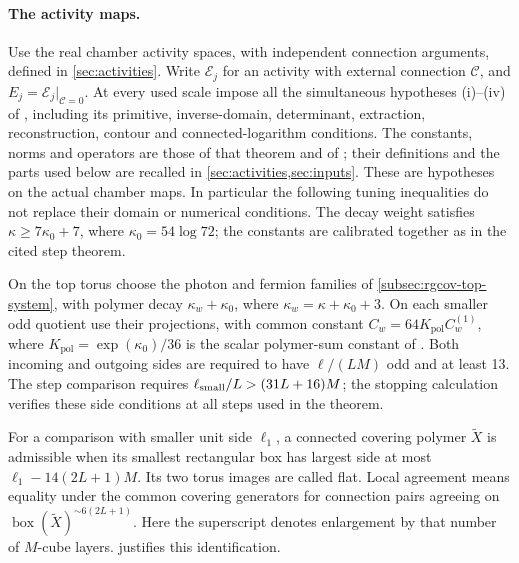 \paragraph{The activity maps.}
Use the real chamber activity spaces, with independent connection
arguments, defined in \cref{sec:activities}. Write \(\mathscr E_j\) for an activity
with external connection \(\mathscr C\), and \(E_j=\mathscr E_j|_{\mathscr C=0}\).
At every used scale impose all the simultaneous hypotheses
(i)--(iv) of \cite[Theorem~A]{NonlinearStep}, including its
primitive, inverse-domain, determinant, extraction, reconstruction,
contour and connected-logarithm conditions. The constants, norms and
operators are those of that theorem and of
\cite[Theorems~A--B]{NormalizedContraction}; their definitions and the
parts used below are recalled in \cref{sec:activities,sec:inputs}.
These are hypotheses on the actual chamber maps. In particular the
following tuning inequalities do not replace their domain or numerical
conditions. The decay weight satisfies \(\kappa\ge7\kappa_0+7\), where
\(\kappa_0=54\log72\); the constants are calibrated together as in the
cited step theorem.

On the top torus choose the photon and fermion families of
\cref{subsec:rgcov-top-system}, with polymer decay
\(\kappa_w+\kappa_0\), where \(\kappa_w=\kappa+\kappa_0+3\).
On each smaller odd quotient use their projections, with common
constant \(C_w=64K_{\mathrm{pol}}C_w^{(1)}\), where
\(K_{\mathrm{pol}}=\exp(\kappa_0)/36\) is the scalar polymer-sum
constant of \cite[Appendix~B, (81)]{NormalizedContraction}.
Both incoming and outgoing sides are required to have
\(\ell/(LM)\) odd and at least 13. The step comparison requires
\(\ell_{\rm small}/L>(31L+16)M\); the stopping calculation verifies
these side conditions at all steps used in the theorem.

For a comparison with smaller unit side $\ell_1$, a connected
covering polymer $\widetilde X$ is admissible when its smallest
rectangular box has largest side at most $\ell_1-14(2L+1)M$.
Its two torus images are called flat. Local agreement means equality
under the common covering generators for connection pairs agreeing
on $\operatorname{box}(\widetilde X)^{\sim6(2L+1)}$.
Here the superscript denotes enlargement by that number of $M$-cube
layers.  justifies this identification.

